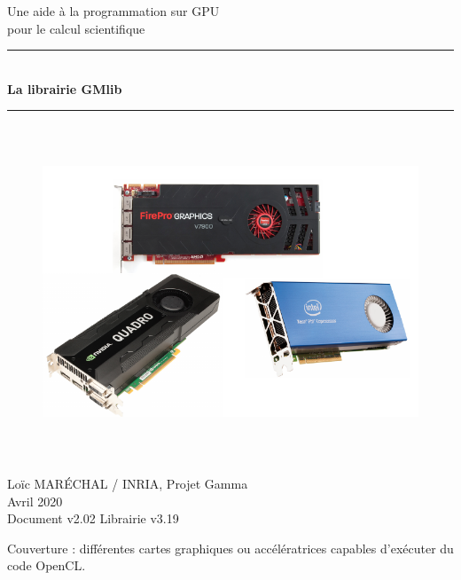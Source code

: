 \documentclass[a4paper,12pt]{article}
\newcommand{\HRule}{\rule{\linewidth}{1mm}}
\begin{document}
%
%

\begin{titlepage}

\begin{center}
\huge Une aide à la programmation sur GPU\\ pour le calcul scientifique
\HRule \\
\medskip
{\Huge \bfseries La librairie GMlib} \\
\HRule
\end{center}


\begin{figure}[htbp]
\begin{center}
\includegraphics[height=10cm]{gpu.pdf}
\end{center}
\end{figure}


\begin{flushright}
\Large Lo\"ic MAR\'ECHAL / INRIA, Projet Gamma\\
\Large Avril 2020 \\
\normalsize Document v2.02
\normalsize Librairie v3.19
\end{flushright}

\end{titlepage}

\clearpage

\setcounter{tocdepth}{2}
\tableofcontents
\vfill

\footnotesize{Couverture : différentes cartes graphiques ou accélératrices capables d'exécuter du code OpenCL.}
\normalsize
\end{document}
